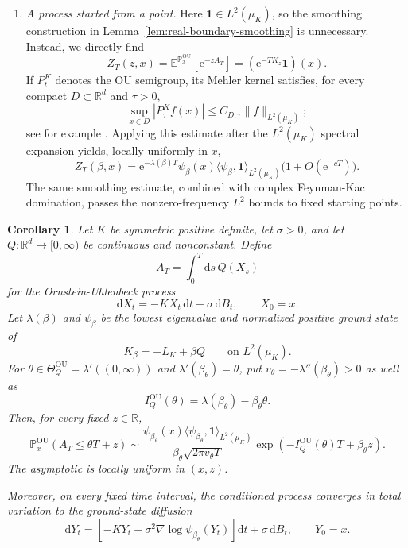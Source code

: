 \documentclass[11pt,reqno]{amsart}
\newtheorem{corollary}[theorem]{Corollary}
\theoremstyle{definition}
\numberwithin{equation}{section}
\newcommand{\<}{\langle}
\renewcommand{\>}{\rangle}
\def\de{{\rm d}}
\def\de{{\mathrm {d}}}
\def\bbP{{\mathbb{P}}}
\begin{document}
\begin{enumerate}
\item[(iv)] \emph{A process started from a point.}
Here $\mathbf 1\in L^2(\mu_K)$, so the smoothing construction in
Lemma~\ref{lem:real-boundary-smoothing} is unnecessary.  Instead, we directly find
\[
    Z_T(z,x)=\mathbb E^{\bbP_x ^\mathrm{OU}}[\mathrm e^{-zA_T}]
            =(\mathrm e^{-TK_z}\mathbf 1)(x).
\]
If $P_t^K$ denotes the OU semigroup, its Mehler kernel satisfies, for every
compact $D\subset\mathbb R^d$ and $\tau>0$,
\[
    \sup_{x\in D}|P_\tau^Kf(x)|
       \leq C_{D,\tau}\|f\|_{L^2(\mu_K)};
\]
see for example \cite{Stroock20}.
Applying this estimate after the $L^2(\mu_K)$ spectral expansion yields,
locally uniformly in $x$,
\[
    Z_T(\beta,x)
      =\mathrm e^{-\lambda(\beta)T}\psi_\beta(x)
       \langle\psi_\beta,\mathbf 1\rangle_{L^2(\mu_K)}
       \bigl(1+O(\mathrm e^{-cT})\bigr).
\]
The same smoothing estimate, combined with complex Feynman-Kac domination,
passes the nonzero-frequency $L^2$ bounds to fixed starting points.

\end{enumerate}

\begin{corollary}
\label{cor:ou-extension}
Let $K$ be symmetric positive definite, let $\sigma>0$, and let
$Q:\mathbb R^d\to[0,\infty)$ be continuous and nonconstant.  Define
\[
    A_T=\int_0^T \de s \, Q(X_s)
\]
for the Ornstein-Uhlenbeck process
\[
    \de X_t=-KX_t\,\de t+\sigma\,\de B_t,
    \qquad X_0=x.
\]
Let $\lambda(\beta)$ and $\psi_\beta$ be the lowest eigenvalue and
normalized positive ground state of
\[
    K_\beta=-L_K+\beta Q
    \qquad\text{on }L^2(\mu_K).
\]
For $\theta\in\Theta_Q^{\mathrm{OU}}
       =\lambda'((0,\infty))$ and $\lambda'(\beta_\theta)=\theta$,
put $v_\theta=-\lambda''(\beta_\theta)>0$ as well as 
\[
    I_Q^{\mathrm{OU}}(\theta)
       =\lambda(\beta_\theta)-\beta_\theta\theta.
\]
Then, for every fixed $z\in\mathbb R$,
\[
    \bbP_x^{\mathrm{OU}}(A_T\leq\theta T+z)
    \sim
    \frac{
      \psi_{\beta_\theta}(x)
      \langle\psi_{\beta_\theta},\mathbf 1\rangle_{L^2(\mu_K)}
    }{
      \beta_\theta\sqrt{2\pi v_\theta T}
    }
    \exp\!\left(
       -I_Q^{\mathrm{OU}}(\theta)T+\beta_\theta z
    \right).
\]
The asymptotic is locally uniform in $(x,z)$.

Moreover, on every fixed time interval, the conditioned process converges
in total variation to the ground-state diffusion
\[
    \de Y_t
      =
      \left[
        -KY_t+\sigma^2\nabla\log
        \psi_{\beta_\theta}(Y_t)
      \right]\de t
      +\sigma\,\de B_t,
    \qquad Y_0=x.
\]
\end{corollary}
\end{document}
